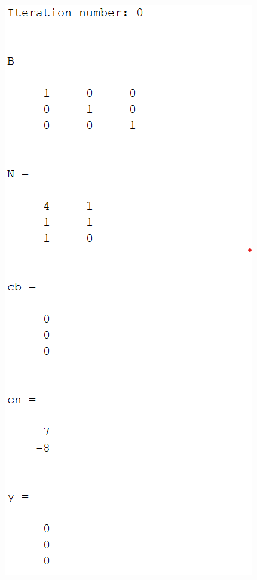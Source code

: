 \documentclass{article}
\begin{document}
\begin{itemize}
\begin{center}
        \includegraphics[scale = 0.7]{2_2_v_iter0}

\end{center}
\end{itemize}
\end{document}
